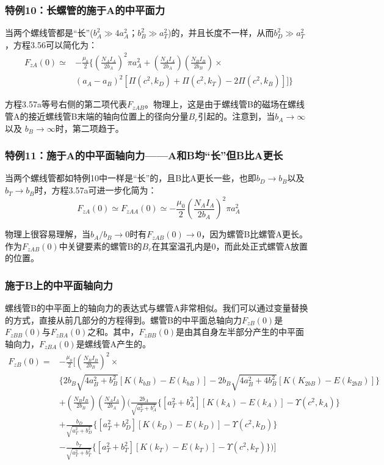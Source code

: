 \subsubsection{特例10：长螺管的施于A的中平面力}
当两个螺线管都是“长”($b_A^2\gg 4a_A^2；b_B^2\gg a_T^2$)的，并且长度不一样，从而$b_D^2\gg a_T^2$，方程3.56可以简化为：
\begin{equation}
\begin{split}
F_{zA}(0)\simeq& -\frac{\mu_0}{2}\{(\frac{N_AI_A}{2b_A})^2\pi a_A^2+(\frac{N_AI_A}{2b_A})(\frac{N_BI_B}{2b_{B}})\times\\
&(a_A-a_B)^2[\Pi(c^2,k_D)+\Pi(c^2,k_T)-2\Pi(c^2,k_B)]]\}
\end{split}
\end{equation}

方程3.57a等号右侧的第二项代表$F_{zAB}$。物理上，这是由于螺线管B的磁场在螺线管A的接近螺线管B末端的轴向位置上的径向分量$B_r$引起的。注意到，当$b_A\rightarrow \infty$以及 $b_B\rightarrow \infty$时，第二项趋于。
\subsubsection{特例11：施于A的中平面轴向力——A和B均“长”但B比A更长}
当两个螺线管都如特例10中一样是“长”的，且B比A更长一些，也即$b_D\rightarrow b_B$以及$b_T\rightarrow b_B$时，方程3.57a可进一步化简为：
\begin{equation*}
F_{zA}(0)\simeq F_{zAA}(0)\simeq -\frac{\mu_0}{2}(\frac{N_AI_A}{2b_A})^2\pi a_A^2 \tag{3.57'}
\end{equation*}

物理上很容易理解，当$b_A/b_B\rightarrow 0$时有$F_{zAB}(0)\rightarrow 0$，因为螺管B比螺管A更长。作为$F_{zAB}(0)$中关键要素的螺管B的$B_r$在其室温孔内是0，而此处正式螺管A放置的位置。

\subsubsection{施于B上的中平面轴向力}
螺线管B的中平面上的轴向力的表达式与螺管A非常相似。我们可以通过变量替换的方式，直接从前几部分的方程得到。螺管B的中平面总轴向力$F_{zB}(0)$是$F_{zBB}(0)$与$F_{zBA}(0)$之和。其中，$F_{zBB}(0)$是由其自身左半部分产生的中平面轴向力，$F_{zBA}(0)$是螺线管A产生的。
\begin{equation}
\begin{split}
F_{zB}(0)=&-\frac{\mu_0}{2}\bigg[(\frac{N_BI_B}{2b_B})^2\times\\
&\{2b_B\sqrt{4a_B^2+b_B^2}[K(k_{bB})-E(k_{bB})]-2b_B\sqrt{4a_B^2+4b_B^2}[K(K_{2bB})-E(k_{2bB})]\}\\
&+(\frac{N_BI_B}{2b_B})(\frac{N_AI_A}{2b_A})\big(\frac{2b_A}{\sqrt{a_T^2+b_A^2}}\{[a_T^2+b_A^2][K(k_A)-E(k_A)]-\Upsilon(c^2,k_A)\}\\
&+\frac{b_D}{\sqrt{a_T^2+b_D^2}}\{[a_T^2+b_D^2][K(k_D)-E(k_D)]-\Upsilon(c^2,k_D)\}\\
&-\frac{b_T}{\sqrt{a_T^2+b_T^2}}\{[a_T^2+b_T^2][K(k_T)-E(k_T)]-\Upsilon(c^2,k_T)\}\big)\bigg]
\end{split}
\end{equation}

